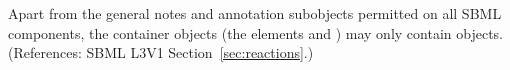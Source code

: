 Apart from the general notes and annotation subobjects permitted on all
SBML components, the \ListOfSpeciesReferences container objects (\ie the
\Reaction elements  and ) may
only contain \SpeciesReference objects.  (References: SBML L3V1
Section~\ref{sec:reactions}.)
